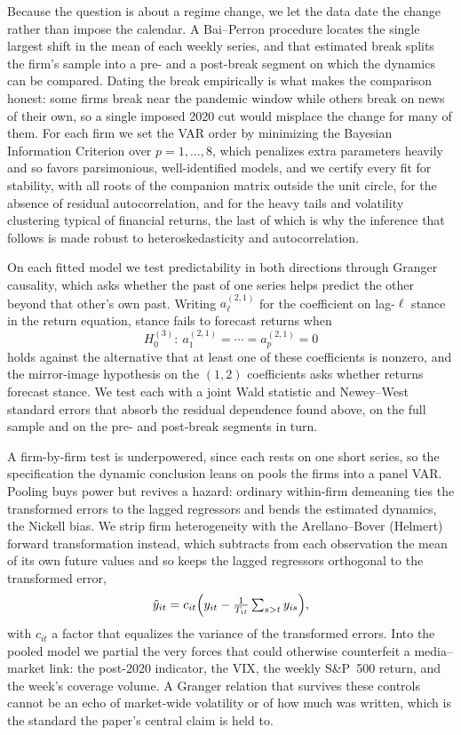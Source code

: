 \documentclass[conference]{IEEEtran}
\begin{document}
Because the question is about a regime change, we let the data date the change rather
than impose the calendar. A Bai--Perron procedure locates the single largest shift in
the mean of each weekly series, and that estimated break splits the firm's sample into
a pre- and a post-break segment on which the dynamics can be compared. Dating the
break empirically is what makes the comparison honest: some firms break near the
pandemic window while others break on news of their own, so a single imposed 2020 cut
would misplace the change for many of them. For each firm we set the VAR order by
minimizing the Bayesian Information Criterion over $p = 1,\dots,8$, which penalizes
extra parameters heavily and so favors parsimonious, well-identified models, and we
certify every fit for stability, with all roots of the companion matrix outside the
unit circle, for the absence of residual autocorrelation, and for the heavy tails and
volatility clustering typical of financial returns, the last of which is why the
inference that follows is made robust to heteroskedasticity and autocorrelation.

On each fitted model we test predictability in both directions through Granger
causality, which asks whether the past of one series helps predict the other beyond
that other's own past. Writing $a^{(2,1)}_\ell$ for the coefficient on lag-$\ell$
stance in the return equation, stance fails to forecast returns when
\begin{equation*}
H_0^{(3)}:\ a^{(2,1)}_1 = \cdots = a^{(2,1)}_p = 0
\end{equation*}
holds against the alternative that at least one of these coefficients is nonzero, and
the mirror-image hypothesis on the $(1,2)$ coefficients asks whether returns forecast
stance. We test each with a joint Wald statistic and Newey--West standard errors that
absorb the residual dependence found above, on the full sample and on the pre- and
post-break segments in turn.

A firm-by-firm test is underpowered, since each rests on one short series, so the
specification the dynamic conclusion leans on pools the firms into a panel VAR.
Pooling buys power but revives a hazard: ordinary within-firm demeaning ties the
transformed errors to the lagged regressors and bends the estimated dynamics, the
Nickell bias. We strip firm heterogeneity with the Arellano--Bover (Helmert) forward
transformation instead, which subtracts from each observation the mean of its own
future values and so keeps the lagged regressors orthogonal to the transformed error,
\begin{equation}
\tilde{y}_{it} = c_{it}\Bigl(y_{it} - \tfrac{1}{T_{it}}\textstyle\sum_{s>t} y_{is}\Bigr),
\end{equation}
with $c_{it}$ a factor that equalizes the variance of the transformed errors. Into the
pooled model we partial the very forces that could otherwise counterfeit a
media--market link: the post-2020 indicator, the VIX, the weekly S\&P~500 return, and
the week's coverage volume. A Granger relation that survives these controls cannot be
an echo of market-wide volatility or of how much was written, which is the standard the
paper's central claim is held to.
\end{document}
